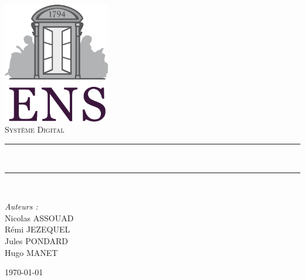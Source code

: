 \documentclass[a4paper, 12pt, twoside]{report}
\newcommand{\HRule}{\rule{\linewidth}{0.5mm}}
\begin{document}

\begin{titlepage}
\begin{center}

\includegraphics[width=0.35\textwidth]{./ENS_Logo.png}~\\[1cm]

\textsc{\Large Système Digital}\\[0.5cm]

\HRule \\[0.4cm{ \huge \bfseries Microprocesseur \\[0.4cm] }
\large{\textit{Implémentation d'une horloge digitale}}]

\HRule \\[1.5cm]
\end{center}

\begin{minipage}{0.4\textwidth}
\begin{flushleft} \large
\emph{Auteurs :}\\
Nicolas ASSOUAD\\
Rémi JEZEQUEL\\
Jules PONDARD\\
Hugo MANET\\
\end{flushleft}
\end{minipage}

\begin{center}
\vfill
{\large \today}

\end{center}
\end{titlepage}

\newpage\strut
\tableofcontents
\thispagestyle{fancyplain}

\newpage~
\newpage~
\end{document}
